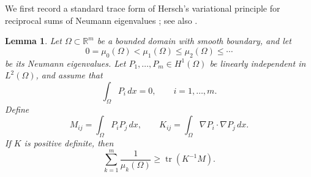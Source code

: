 \documentclass[11pt,letterpaper,reqno]{amsart}
\newtheorem{lemma}[theorem]{Lemma}
\theoremstyle{definition}
\DeclareMathOperator{\tr}{tr}
\newcommand{\R}{\mathbb R}
\begin{document}
We first record a standard trace form of Hersch's variational principle
for reciprocal sums of Neumann eigenvalues \cite{Her61}; see also
\cite{HX93}.

\begin{lemma}\label{lem:Ritz}
Let \(\Omega\subset\R^m\) be a bounded domain with smooth boundary, and
let
\[
        0=\mu_0(\Omega)<\mu_1(\Omega)\leq\mu_2(\Omega)\leq\cdots
\]
be its Neumann eigenvalues. Let
\(P_1,\ldots,P_m\in H^1(\Omega)\) be linearly independent in
\(L^2(\Omega)\), and assume that
\[
        \int_\Omega P_i\,dx=0,
        \qquad i=1,\ldots,m.
\]
Define
\[
        M_{ij}=\int_\Omega P_iP_j\,dx,
        \qquad
        K_{ij}=\int_\Omega \nabla P_i\cdot\nabla P_j\,dx.
\]
If \(K\) is positive definite, then
\[
        \sum_{k=1}^m \frac1{\mu_k(\Omega)}\geq \tr(K^{-1}M).
\]
\end{lemma}
\end{document}
